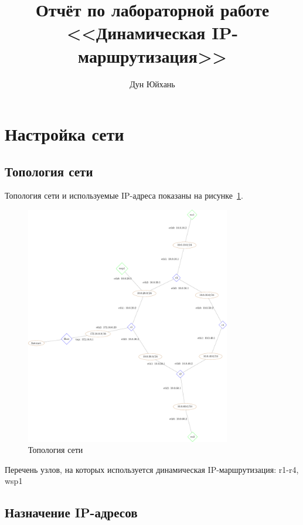\documentclass[a4paper,12pt]{article}
\title{Отчёт по лабораторной работе \\ <<Динамическая IP-маршрутизация>>}
\author{Дун Юйхань}
\begin{document}
\maketitle

\tableofcontents

\section{Настройка сети}

\subsection{Топология сети}

Топология сети и используемые IP-адреса показаны на рисунке~\ref{fig:network}.

\begin{figure}
\centering
\includegraphics[width=0.8\textwidth]{includes/network_gv.pdf}
\caption{Топология сети}
\label{fig:network}
\end{figure}

Перечень узлов, на которых используется динамическая IP-маршрутизация: r1-r4, wsp1


\subsection{Назначение IP-адресов}
\end{document}
